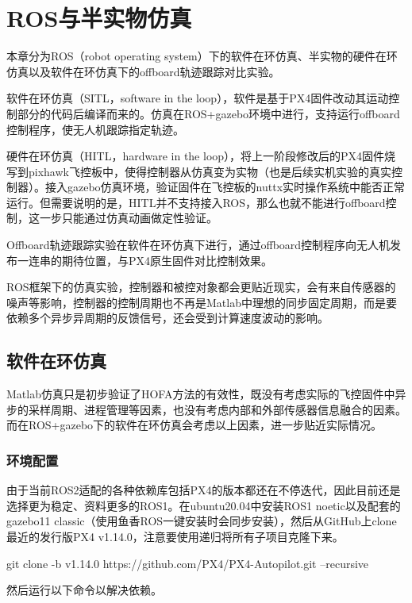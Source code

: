 \chapter{ROS与半实物仿真}
本章分为ROS（robot operating system）下的软件在环仿真、半实物的硬件在环仿真以及软件在环仿真下的offboard轨迹跟踪对比实验。

软件在环仿真（SITL，software in the loop），软件是基于PX4固件改动其运动控制部分的代码后编译而来的。仿真在ROS+gazebo环境中进行，支持运行offboard控制程序，使无人机跟踪指定轨迹。

硬件在环仿真（HITL，hardware in the loop），将上一阶段修改后的PX4固件烧写到pixhawk飞控板中，使得控制器从仿真变为实物（也是后续实机实验的真实控制器）。接入gazebo仿真环境，验证固件在飞控板的nuttx实时操作系统中能否正常运行。但需要说明的是，HITL并不支持接入ROS，那么也就不能进行offboard控制，这一步只能通过仿真动画做定性验证。

Offboard轨迹跟踪实验在软件在环仿真下进行，通过offboard控制程序向无人机发布一连串的期待位置，与PX4原生固件对比控制效果。

ROS框架下的仿真实验，控制器和被控对象都会更贴近现实，会有来自传感器的噪声等影响，控制器的控制周期也不再是Matlab中理想的同步固定周期，而是要依赖多个异步异周期的反馈信号，还会受到计算速度波动的影响。

\section{软件在环仿真}
Matlab仿真只是初步验证了HOFA方法的有效性，既没有考虑实际的飞控固件中异步的采样周期、进程管理等因素，也没有考虑内部和外部传感器信息融合的因素。而在ROS+gazebo下的软件在环仿真会考虑以上因素，进一步贴近实际情况。

\subsection*{环境配置}
由于当前ROS2适配的各种依赖库包括PX4的版本都还在不停迭代，因此目前还是选择更为稳定、资料更多的ROS1。在ubuntu20.04中安装ROS1 noetic以及配套的gazebo11 classic（使用鱼香ROS一键安装\cite{fishros}时会同步安装），然后从GitHub上clone最近的发行版PX4 v1.14.0，注意要使用递归将所有子项目克隆下来。
\begin{codeblock}[language=C]
  git clone -b v1.14.0 https://github.com/PX4/PX4-Autopilot.git --recursive
\end{codeblock}



然后运行以下命令以解决依赖。

